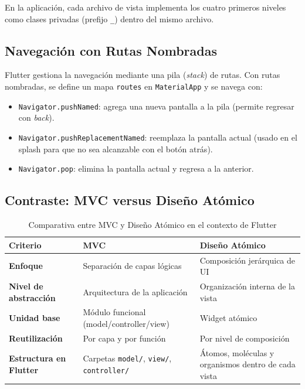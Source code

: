 \documentclass[12pt,a4paper]{article}
\begin{document}
En la aplicación, cada archivo de vista implementa los cuatro primeros niveles como clases privadas (prefijo \texttt{\_}) dentro del mismo archivo.

\subsection{Navegación con Rutas Nombradas}

Flutter gestiona la navegación mediante una pila (\textit{stack}) de rutas. Con rutas nombradas, se define un mapa \texttt{routes} en \texttt{MaterialApp} y se navega con:
\begin{itemize}
  \item \texttt{Navigator.pushNamed}: agrega una nueva pantalla a la pila (permite regresar con \textit{back}).
  \item \texttt{Navigator.pushReplacementNamed}: reemplaza la pantalla actual (usado en el splash para que no sea alcanzable con el botón atrás).
  \item \texttt{Navigator.pop}: elimina la pantalla actual y regresa a la anterior.
\end{itemize}

\subsection{Contraste: MVC versus Diseño Atómico}

\begin{table}[H]
\centering
\caption{Comparativa entre MVC y Diseño Atómico en el contexto de Flutter}
\label{tab:mvc_vs_atomic}
\renewcommand{\arraystretch}{1.4}
\begin{tabular}{>{\bfseries}p{3.2cm} p{5cm} p{5cm}}
\toprule
Criterio & MVC & Diseño Atómico \\
\midrule
Enfoque & Separación de capas lógicas & Composición jerárquica de UI \\
Nivel de abstracción & Arquitectura de la aplicación & Organización interna de la vista \\
Unidad base & Módulo funcional (model/controller/view) & Widget atómico \\
Reutilización & Por capa y por función & Por nivel de composición \\
Estructura en Flutter & Carpetas \texttt{model/}, \texttt{view/}, \texttt{controller/} & Átomos, moléculas y organismos dentro de cada vista \\
\bottomrule
\end{tabular}
\end{table}
\end{document}
